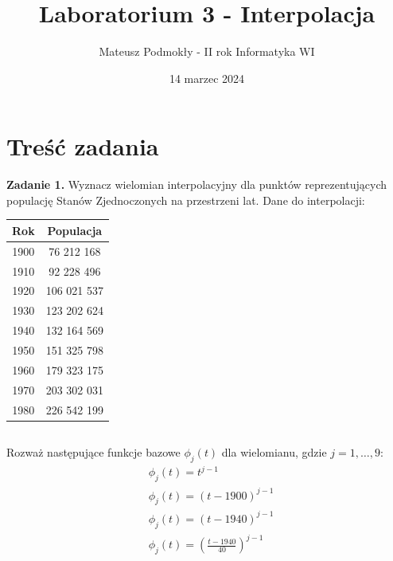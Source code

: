 \documentclass[11pt]{scrartcl}
\title{Laboratorium 3 - Interpolacja}
\author{Mateusz Podmokły - II rok Informatyka WI}
\date{14 marzec 2024}
\begin{document}
    \maketitle

    \section{Treść zadania}
    \textbf{Zadanie 1.} Wyznacz wielomian interpolacyjny dla punktów
    reprezentujących populację Stanów Zjednoczonych na przestrzeni
    lat. Dane do interpolacji:

    \begin{table}[H]
        \centering
        \begin{tabular}{c | c}
            Rok & Populacja \\
            \hline
            1900 & 76 212 168 \\
            1910 & 92 228 496 \\
            1920 & 106 021 537 \\
            1930 & 123 202 624 \\
            1940 & 132 164 569 \\
            1950 & 151 325 798 \\
            1960 & 179 323 175 \\
            1970 & 203 302 031 \\
            1980 & 226 542 199 \\
        \end{tabular}
    \end{table}
    \subsection*{}
    Rozważ następujące funkcje bazowe $\phi_j(t)$ dla wielomianu,
    gdzie $j=1, \ldots ,9$:
    \begin{align}
        & \phi_j(t) = t^{j-1} \\
        & \phi_j(t) = (t-1900)^{j-1} \\
        & \phi_j(t) = (t-1940)^{j-1} \\
        & \phi_j(t) = \left(\frac{t-1940}{40}\right)^{j-1}
    \end{align}
\end{document}
